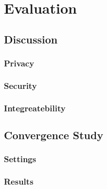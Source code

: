 \section{Evaluation}
\subsection{Discussion}
\subsubsection{Privacy}
\subsubsection{Security}
\subsubsection{Integreatebility}
\subsection{Convergence Study}
\subsubsection{Settings}
\subsubsection{Results}